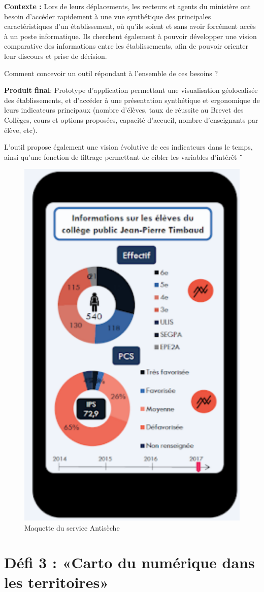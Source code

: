 \documentclass[]{book}
\begin{document}
\textbf{Contexte : } Lors de leurs déplacements, les recteurs et agents
du ministère ont besoin d'accéder rapidement à une vue synthétique des
principales caractéristiques d'un établissement, où qu'ils soient et
sans avoir forcément accès à un poste informatique. Ils cherchent
également à pouvoir développer une vision comparative des informations
entre les établissements, afin de pouvoir orienter leur discours et
prise de décision.

Comment concevoir un outil répondant à l'ensemble de ces besoins ?

\textbf{Produit final}: Prototype d'application permettant une
visualisation géolocalisée des établissements, et d'accéder à une
présentation synthétique et ergonomique de leurs indicateurs principaux
(nombre d'élèves, taux de réussite au Brevet des Collèges, cours et
options proposées, capacité d'accueil, nombre d'enseignants par élève,
etc).

L'outil propose également une vision évolutive de ces indicateurs dans
le temps, ainsi qu'une fonction de filtrage permettant de cibler les
variables d'intérêt ¨

\begin{figure}

{\centering \includegraphics[width=0.4\linewidth]{./img/antiseche} 

}

\caption{Maquette du service Antisèche}\label{fig:unnamed-chunk-10}
\end{figure}

\section{Défi 3 : «Carto du numérique dans les
territoires»}\label{defi-3-carto-du-numerique-dans-les-territoires}
\end{document}
